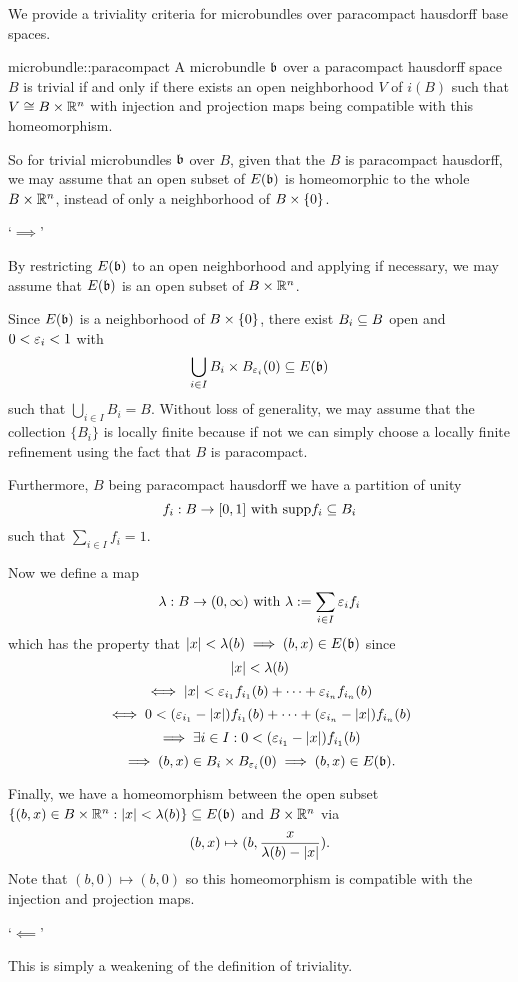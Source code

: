 \begin{myparagraph}
    We provide a triviality criteria for microbundles over paracompact hausdorff base spaces.
\end{myparagraph}

\begin{mylemma}{microbundle::paracompact}{}
    A microbundle $\mathfrak{b}$ over a paracompact hausdorff space $B$ is trivial
    if and only if there exists an open neighborhood $V$ of $i(B)$ such that $V \cong B \times \mathbb{R}^n$
    with injection and projection maps being compatible with this homeomorphism.
\end{mylemma}

\begin{myparagraph}
    So for trivial microbundles $\mathfrak{b}$ over $B$, given that the $B$ is paracompact hausdorff,
    we may assume that an open subset of $E(\mathfrak{b})$ is homeomorphic to the whole $B \times \mathbb{R}^n$,
    instead of only a neighborhood of $B \times{} \{0\}$.
\end{myparagraph}

\begin{myproof}
    `$\implies$'

    By restricting $E(\mathfrak{b})$ to an open neighborhood
    and applying  if necessary,
    we may assume that $E(\mathfrak{b})$ is an open subset of $B \times \mathbb{R}^n$.

    Since $E(\mathfrak{b})$ is a neighborhood of $B \times{} \{0\}$, there exist $B_i \subseteq{} B$ open and $0 < \varepsilon{}_i < 1$ with
    \[ \bigcup_{i \in I } B_i \times \ball[\eps_i] \sub E(\bb)\]
    such that $\bigcup_{i \in I} B_i = B$.
    Without loss of generality, we may assume that the collection $\{B_i\}$ is locally finite because if not
    we can simply choose a locally finite refinement using the fact that $B$ is paracompact.

    Furthermore, $B$ being paracompact hausdorff we have a partition of unity
    \[ f_i: B \to [0, 1] \text{ with } \text{supp}{f_i} \subseteq{} B_i\]
    such that $\sum_{i \in I}f_i = 1$.
    
    Now we define a map
    \[ \lambda: B \to (0, \infty) \text{ with } \lambda := \sum_{i \in I} \varepsilon{}_i f_i \]
    which has the property that $\vert{} x \vert{} < \lambda(b) \implies (b, x) \in E(\mathfrak{b})$ since
    \[ \vert{} x \vert{} < \lambda(b) \]
    \[ \iff  \vert{} x \vert{} < \varepsilon{}_{i_1} f_{i_1}(b) + \cdots + \varepsilon{}_{i_n} f_{i_n}(b) \]
    \[ \iff 0 < (\varepsilon{}_{i_1} - \vert{} x \vert{}) f_{i_1}(b) + \cdots + (\varepsilon{}_{i_n} - \vert{} x \vert{}) f_{i_n}(b) \]
    \[ \implies \exists i \in I: 0 < (\varepsilon{}_{i_1} - \vert{} x \vert{}) f_{i_1}(b) \]
    \[ \implies (b, x) \in B_i \times \ball[\eps_i]  \implies (b, x) \in E(\bb). \]

    Finally, we have a homeomorphism between the open subset
    $\{(b, x) \in B \times \mathbb{R}^n:\vert{} x \vert{} < \lambda(b)\} \subseteq{} E(\mathfrak{b})$ and $B \times \mathbb{R}^n$ via
    \[ (b, x) \mapsto (b, \frac{x}{\lambda(b) - \vert{} x \vert{}}). \]
    Note that $(b, 0) \mapsto (b, 0)$ so this homeomorphism
    is compatible with the injection and projection maps.

    `$\impliedby$'

    This is simply a weakening of the definition of triviality. 
\end{myproof}